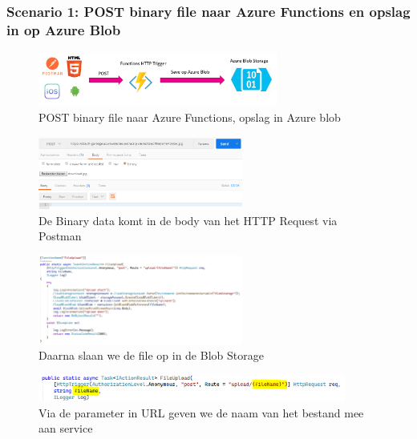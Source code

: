 \documentclass{article}
\begin{document}
\subsubsection{Scenario 1: POST binary file naar Azure Functions en opslag in op Azure Blob}

\begin{figure}[H]
    \centering
    \includegraphics[width=0.7\textwidth]{azure-storage-scenario-1.png}
    \caption{POST binary file naar Azure Functions, opslag in Azure blob}
\end{figure}

\begin{figure}[H]
    \centering
    \includegraphics[width=0.6\textwidth]{scenario-1-1.png}
    \caption{De Binary data komt in de body van het HTTP Request via Postman}
\end{figure}

\begin{figure}[H]
    \centering
    \includegraphics[width=0.6\textwidth]{scenario-1-2.png}
    \caption{Daarna slaan we de file op in de Blob Storage}
\end{figure}

\begin{figure}[H]
    \centering
    \includegraphics[width=0.9\textwidth]{scenario-1-3.png}
    \caption{Via de parameter in URL geven we de naam van het bestand mee aan service}
\end{figure}
\end{document}
